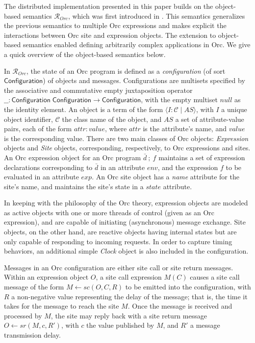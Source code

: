\documentclass{eptcs}
\begin{document}
The distributed implementation presented in this paper builds on the object-based semantics $\mathcal{R}_{Orc}$, which was first introduced in \cite{AlTurkiM07WWV}. This semantics generalizes the previous semantics to multiple Orc expressions and makes explicit the interactions between Orc site and expression objects. 
The extension to object-based semantics enabled defining arbitrarily complex applications in Orc. We give a quick overview of the object-based semantics below.


In $\mathcal{R}_{Orc}$, the state of an Orc program is defined as a \emph{configuration} (of sort $\mathsf{Configuration}$) of objects and messages. Configurations are multisets specified by the associative and commutative empty juxtaposition operator $\_\_ : \mathsf{Configuration} \; \mathsf{Configuration} \to \mathsf{Configuration}$, with the empty multiset $\mathit{null}$ as the identity element. An object is a term of the form $\langle I : \mathcal{C}\;|\; \mathit{AS} \rangle$, with $I$ a unique object identifier, $\mathcal{C}$ the class name of the object, and $\mathit{AS}$ a set of attribute-value pairs, each of the form $\mathit{attr} : \mathit{value}$, where $\mathit{attr}$ is the attribute's name, and $\mathit{value}$ is the corresponding value. There are two main classes of Orc objects: \emph{Expression} objects and \emph{Site} objects, corresponding, respectively, to Orc expressions and sites.  An Orc expression object for an Orc program $\bar{d} ~;~ f$ maintains a set of expression declarations corresponding to $\bar{d}$ in an attribute $\mathit{env}$, and the expression $f$ to be evaluated in an attribute $\mathit{exp}$. An Orc site object has a \emph{name} attribute for the site's name, and maintains the site's state in a $\mathit{state}$ attribute.

In keeping with the philosophy of the Orc theory, expression objects are modeled as active objects with one or more threads of control (given as an Orc expression), and are capable 
of initiating (asynchronous) message exchange. Site objects, on the other hand, are reactive objects having internal states but are only capable of responding to incoming requests. In order to capture timing behaviors, an additional simple \emph{Clock} object is also included in the configuration.

Messages in an Orc configuration are either site call or site return messages. Within an expression object $O$, a site call expression $M(C)$ causes a site call message of the form $M \gets sc(O, C, R)$ to be emitted into the configuration, with $R$ a non-negative value representing the delay of the message; that is, the time it takes for the message to reach the site $M$. Once the message is received and processed by $M$, the site may reply back with a site return message $O \gets sr(M,c, R')$, with $c$ the value published by $M$, and $R'$ a message transmission delay.
\end{document}
